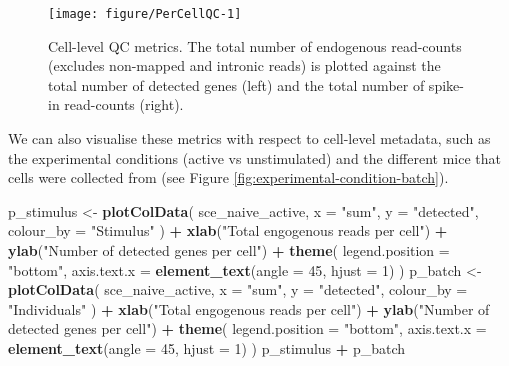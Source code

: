 \documentclass[9pt,a4paper,]{extarticle}
\newenvironment{Shaded}{\begin{snugshade}}{\end{snugshade}}
\newcommand{\DataTypeTok}[1]{\textcolor[rgb]{0.13,0.29,0.53}{#1}}
\newcommand{\DecValTok}[1]{\textcolor[rgb]{0.00,0.00,0.81}{#1}}
\newcommand{\KeywordTok}[1]{\textcolor[rgb]{0.13,0.29,0.53}{\textbf{#1}}}
\newcommand{\NormalTok}[1]{#1}
\newcommand{\OperatorTok}[1]{\textcolor[rgb]{0.81,0.36,0.00}{\textbf{#1}}}
\newcommand{\StringTok}[1]{\textcolor[rgb]{0.31,0.60,0.02}{#1}}
\begin{document}
\begin{figure}

{\centering \texttt{[image: figure/PerCellQC-1]} 

}

\caption{Cell-level QC metrics. The total number of endogenous read-counts (excludes non-mapped and intronic reads) is plotted against the total number of detected genes (left) and the total number of spike-in read-counts (right).}\label{fig:PerCellQC}
\end{figure}

We can also visualise these metrics with respect to cell-level metadata, such
as the experimental conditions (active vs unstimulated) and the different mice
that cells were collected from
(see Figure \ref{fig:experimental-condition-batch}).

\begin{Shaded}
\begin{Highlighting}[]
\NormalTok{p_stimulus <-}\StringTok{ }\KeywordTok{plotColData}\NormalTok{(}
\NormalTok{    sce_naive_active,}
    \DataTypeTok{x =} \StringTok{"sum"}\NormalTok{,}
    \DataTypeTok{y =} \StringTok{"detected"}\NormalTok{, }
    \DataTypeTok{colour_by =} \StringTok{"Stimulus"}
\NormalTok{  ) }\OperatorTok{+}
\StringTok{  }\KeywordTok{xlab}\NormalTok{(}\StringTok{"Total engogenous reads per cell"}\NormalTok{) }\OperatorTok{+}
\StringTok{  }\KeywordTok{ylab}\NormalTok{(}\StringTok{"Number of detected genes per cell"}\NormalTok{) }\OperatorTok{+}
\StringTok{  }\KeywordTok{theme}\NormalTok{(}
    \DataTypeTok{legend.position =} \StringTok{"bottom"}\NormalTok{,}
    \DataTypeTok{axis.text.x =} \KeywordTok{element_text}\NormalTok{(}\DataTypeTok{angle =} \DecValTok{45}\NormalTok{, }\DataTypeTok{hjust =} \DecValTok{1}\NormalTok{)}
\NormalTok{  )}
\NormalTok{p_batch <-}\StringTok{ }\KeywordTok{plotColData}\NormalTok{(}
\NormalTok{    sce_naive_active,}
    \DataTypeTok{x =} \StringTok{"sum"}\NormalTok{,}
    \DataTypeTok{y =} \StringTok{"detected"}\NormalTok{, }
    \DataTypeTok{colour_by =} \StringTok{"Individuals"}
\NormalTok{  ) }\OperatorTok{+}
\StringTok{  }\KeywordTok{xlab}\NormalTok{(}\StringTok{"Total engogenous reads per cell"}\NormalTok{) }\OperatorTok{+}
\StringTok{  }\KeywordTok{ylab}\NormalTok{(}\StringTok{"Number of detected genes per cell"}\NormalTok{) }\OperatorTok{+}
\StringTok{  }\KeywordTok{theme}\NormalTok{(}
    \DataTypeTok{legend.position =} \StringTok{"bottom"}\NormalTok{,}
    \DataTypeTok{axis.text.x =} \KeywordTok{element_text}\NormalTok{(}\DataTypeTok{angle =} \DecValTok{45}\NormalTok{, }\DataTypeTok{hjust =} \DecValTok{1}\NormalTok{)}
\NormalTok{  )}
\NormalTok{p_stimulus }\OperatorTok{+}\StringTok{ }\NormalTok{p_batch}
\end{Highlighting}
\end{Shaded}
\end{document}
